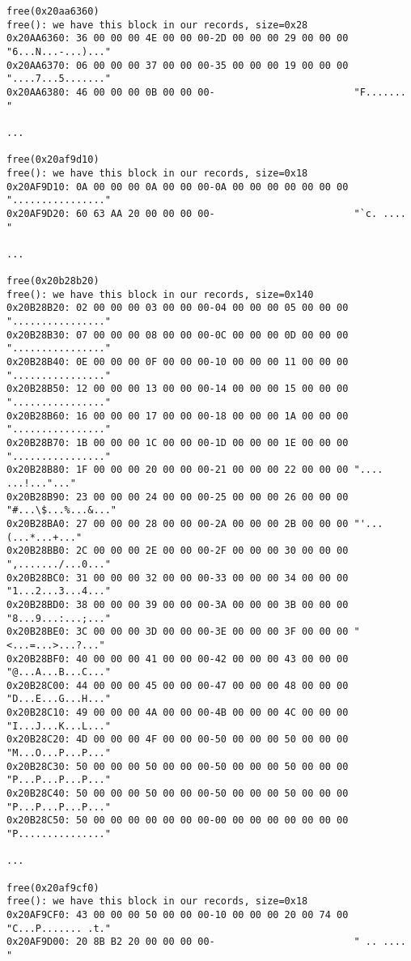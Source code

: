 \begin{lstlisting}
free(0x20aa6360)
free(): we have this block in our records, size=0x28
0x20AA6360: 36 00 00 00 4E 00 00 00-2D 00 00 00 29 00 00 00 "6...N...-...)..."
0x20AA6370: 06 00 00 00 37 00 00 00-35 00 00 00 19 00 00 00 "....7...5......."
0x20AA6380: 46 00 00 00 0B 00 00 00-                        "F.......        "

...

free(0x20af9d10)
free(): we have this block in our records, size=0x18
0x20AF9D10: 0A 00 00 00 0A 00 00 00-0A 00 00 00 00 00 00 00 "................"
0x20AF9D20: 60 63 AA 20 00 00 00 00-                        "`c. ....        "

...

free(0x20b28b20)
free(): we have this block in our records, size=0x140
0x20B28B20: 02 00 00 00 03 00 00 00-04 00 00 00 05 00 00 00 "................"
0x20B28B30: 07 00 00 00 08 00 00 00-0C 00 00 00 0D 00 00 00 "................"
0x20B28B40: 0E 00 00 00 0F 00 00 00-10 00 00 00 11 00 00 00 "................"
0x20B28B50: 12 00 00 00 13 00 00 00-14 00 00 00 15 00 00 00 "................"
0x20B28B60: 16 00 00 00 17 00 00 00-18 00 00 00 1A 00 00 00 "................"
0x20B28B70: 1B 00 00 00 1C 00 00 00-1D 00 00 00 1E 00 00 00 "................"
0x20B28B80: 1F 00 00 00 20 00 00 00-21 00 00 00 22 00 00 00 ".... ...!..."..."
0x20B28B90: 23 00 00 00 24 00 00 00-25 00 00 00 26 00 00 00 "#...\$...%...&..."
0x20B28BA0: 27 00 00 00 28 00 00 00-2A 00 00 00 2B 00 00 00 "'...(...*...+..."
0x20B28BB0: 2C 00 00 00 2E 00 00 00-2F 00 00 00 30 00 00 00 ",......./...0..."
0x20B28BC0: 31 00 00 00 32 00 00 00-33 00 00 00 34 00 00 00 "1...2...3...4..."
0x20B28BD0: 38 00 00 00 39 00 00 00-3A 00 00 00 3B 00 00 00 "8...9...:...;..."
0x20B28BE0: 3C 00 00 00 3D 00 00 00-3E 00 00 00 3F 00 00 00 "<...=...>...?..."
0x20B28BF0: 40 00 00 00 41 00 00 00-42 00 00 00 43 00 00 00 "@...A...B...C..."
0x20B28C00: 44 00 00 00 45 00 00 00-47 00 00 00 48 00 00 00 "D...E...G...H..."
0x20B28C10: 49 00 00 00 4A 00 00 00-4B 00 00 00 4C 00 00 00 "I...J...K...L..."
0x20B28C20: 4D 00 00 00 4F 00 00 00-50 00 00 00 50 00 00 00 "M...O...P...P..."
0x20B28C30: 50 00 00 00 50 00 00 00-50 00 00 00 50 00 00 00 "P...P...P...P..."
0x20B28C40: 50 00 00 00 50 00 00 00-50 00 00 00 50 00 00 00 "P...P...P...P..."
0x20B28C50: 50 00 00 00 00 00 00 00-00 00 00 00 00 00 00 00 "P..............."

...

free(0x20af9cf0)
free(): we have this block in our records, size=0x18
0x20AF9CF0: 43 00 00 00 50 00 00 00-10 00 00 00 20 00 74 00 "C...P....... .t."
0x20AF9D00: 20 8B B2 20 00 00 00 00-                        " .. ....        "
\end{lstlisting}

